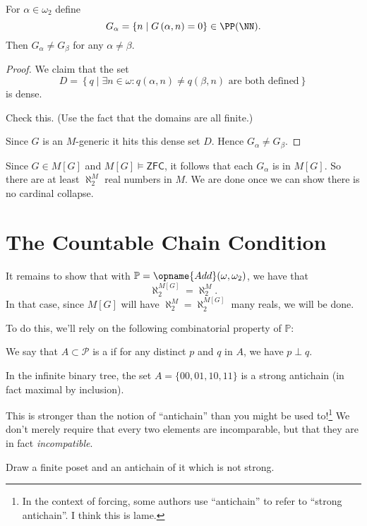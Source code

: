 \documentclass[11pt]{scrreprt}
\newcommand{\ZFC}{\mathsf{ZFC}}
\newcommand{\Po}{\mathbb P}
\begin{document}
\begin{lemma}
	For $\alpha \in \omega_2$ define
	\[ G_\alpha = \left\{ n \mid G\left( \alpha,n \right) = 0 \right\} \in \PP(\NN). \]
	Then $G_\alpha \neq G_\beta$ for any $\alpha \neq \beta$.
\end{lemma}
\begin{proof}
	We claim that the set
	\[ D = \left\{ q \mid \exists n \in \omega :
		q\left( \alpha, n \right) \neq q\left( \beta, n \right)
		\text{ are both defined}
	\right\} \]
	is dense.
	\begin{ques}
		Check this.
		(Use the fact that the domains are all finite.)
	\end{ques}

	Since $G$ is an $M$-generic it hits this dense set $D$.
	Hence $G_\alpha \neq G_\beta$.
\end{proof}

Since $G \in M[G]$ and $M[G] \vDash \ZFC$,
it follows that each $G_\alpha$ is in $M[G]$.
So there are at least $\aleph_2^M$ real numbers in $M$.
We are done once we can show there is no cardinal collapse.

\section{The Countable Chain Condition}
It remains to show that with $\Po = \opname{Add}(\omega, \omega_2)$, we have that
\[ \aleph_2^{M[G]} = \aleph_2^M. \]
In that case, since $M[G]$ will have $\aleph_2^M = \aleph_2^{M[G]}$ many reals, we will be done.

To do this, we'll rely on the following combinatorial property of $\Po$:

\begin{definition}
	We say that $A \subset \mathcal P$ is a 
	if for any distinct $p$ and $q$ in $A$, we have $p \perp q$.
\end{definition}
\begin{example}
	In the infinite binary tree, 
	the set $A = \{00, 01, 10, 11\}$ is a strong antichain
	(in fact maximal by inclusion).
\end{example}
This is stronger than the notion of ``antichain'' than you might be used to!\footnote{%
	In the context of forcing, some authors use ``antichain'' to refer to ``strong antichain''.
	I think this is lame.}
We don't merely require that every two elements are incomparable,
but that they are in fact \emph{incompatible}.
\begin{ques}
	Draw a finite poset and an antichain of it which is not strong.
\end{ques}
\end{document}
